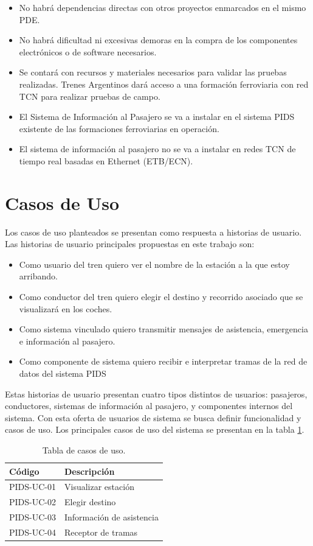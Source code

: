 \begin{itemize}
\item No habrá dependencias directas con otros proyectos enmarcados en el mismo PDE\cite{PDE-TCN}.
\item No habrá dificultad ni excesivas demoras en la compra de los componentes electrónicos o
de software necesarios.
\item Se contará con recursos y materiales necesarios para validar las pruebas realizadas.
Trenes Argentinos dará acceso a una formación ferroviaria con red TCN para realizar
pruebas de campo.
\item El Sistema de Información al Pasajero se va a instalar en el sistema PIDS existente de
las formaciones ferroviarias en operación.
\item El sistema de información al pasajero no se va a instalar en redes TCN de tiempo real
basadas en Ethernet (ETB/ECN).
\end{itemize}


\section{Casos de Uso}
Los casos de uso planteados se presentan como respuesta a historias de usuario. Las historias de usuario principales propuestas en este trabajo son:
\begin{itemize}
\item Como usuario del tren quiero ver el nombre de la estación a la que estoy arribando.
\item Como conductor del tren quiero elegir el destino y recorrido asociado que se visualizará en los coches.
\item Como sistema vinculado quiero transmitir mensajes de asistencia, emergencia e información al pasajero.
\item Como componente de sistema quiero recibir e interpretar tramas de la red de datos del sistema PIDS
\end{itemize}

Estas historias de usuario presentan cuatro tipos distintos de usuarios: pasajeros, conductores, sistemas de información al pasajero, y componentes internos del sistema. Con esta oferta de usuarios de sistema se busca definir funcionalidad y casos de uso. Los principales casos de uso del sistema se presentan en la tabla \ref{tab:UseCases}. \\

\begin{center}
\begin{table}[htb]
\begin{tabular}{|l|l|}
\hline
\textbf{Código} & \textbf{Descripción}     \\ \hline
PIDS-UC-01  & Visualizar estación         \\ \hline
PIDS-UC-02  & Elegir destino             \\ \hline
PIDS-UC-03  & Información de asistencia \\ \hline
PIDS-UC-04  & Receptor de tramas       \\ \hline
\end{tabular}
	\caption{Tabla de casos de uso.}
	\label{tab:UseCases}
\end{table}
\end{center}

